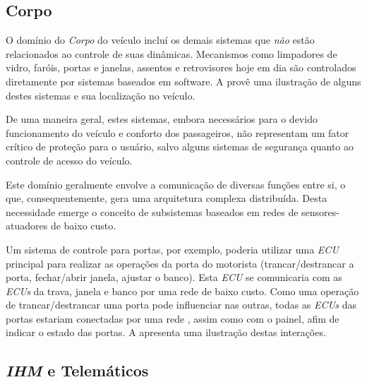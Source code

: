 \subsection{Corpo}

O domínio do \emph{Corpo} do veículo incluí os demais sistemas que \emph{não} estão relacionados ao controle de suas dinâmicas. Mecanismos como limpadores de vidro, faróis, portas e janelas, assentos e retrovisores hoje em dia são controlados diretamente por sistemas baseados em software. A  provê uma ilustração de alguns destes sistemas e sua localização no veículo.


De uma maneira geral, estes sistemas, embora necessários para o devido funcionamento do veículo e conforto dos passageiros, não representam um fator crítico de proteção para o usuário, salvo alguns sistemas de segurança quanto ao controle de acesso do veículo.

Este domínio geralmente envolve a comunicação de diversas funções entre si, o que, consequentemente, gera uma arquitetura complexa distribuída. Desta necessidade emerge o conceito de subsistemas baseados em redes de sensores-atuadores de baixo custo.

Um sistema de controle para portas, por exemplo, poderia utilizar uma \emph{ECU} principal para realizar as operações da porta do motorista (trancar/destrancar a porta, fechar/abrir janela, ajustar o banco). Esta \emph{ECU} se comunicaria com as \emph{ECUs} da trava, janela e banco por uma rede  de baixo custo. Como uma operação de trancar/destrancar uma porta pode influenciar nas outras, todas as \emph{ECUs} das portas estariam conectadas por uma rede , assim como com o painel, afim de indicar o estado das portas. A  apresenta uma ilustração destas interações.


\subsection{\emph{IHM} e Telemáticos}

